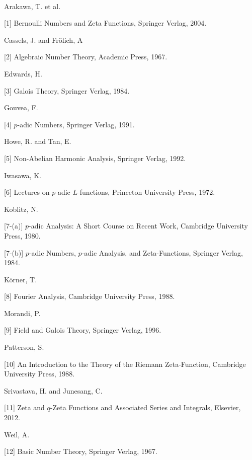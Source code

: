 \begingroup
{}\\
\endgroup
\vspace{0.5cm}

\noindent Arakawa, T. et al.

[1] \quad 
Bernoulli Numbers and Zeta Functions, Springer Verlag, 2004.

\noindent Cassels, J. and Fr\"olich, A 

[2] \quad
Algebraic Number Theory, Academic Press, 1967.


\noindent Edwards, H.

[3] \quad
Galois Theory, Springer Verlag, 1984.


\noindent Gouvea, F.

[4] \quad
$p$-adic Numbers, Springer Verlag, 1991.

\noindent Howe, R. and Tan, E.

[5] \quad
Non-Abelian Harmonic Analysis, Springer Verlag, 1992.

\noindent Iwasawa, K.

[6] \quad
Lectures on $p$-adic $L$-functions, Princeton University Press, 1972.

\noindent Koblitz, N.

[7-(a)] \quad
$p$-adic Analysis: A Short Course on Recent Work, Cambridge University Press, 1980.

[7-(b)] \quad
$p$-adic Numbers, $p$-adic Analysis, and Zeta-Functions, Springer Verlag, 1984.

\noindent K\"orner, T.

[8] \quad
Fourier Analysis, Cambridge University Press, 1988.

\noindent Morandi, P.

[9] \quad
Field and Galois Theory, Springer Verlag, 1996.

\noindent Patterson, S.

[10] \quad
An Introduction to the Theory of the Riemann Zeta-Function, Cambridge University Press, 1988.

\noindent Srivastava, H. and Junesang, C.

[11] \quad
Zeta and $q$-Zeta Functions and Associated Series and Integrals, Elsevier, 2012.

\noindent Weil, A.

[12] \quad
Basic Number Theory, Springer Verlag, 1967.


















